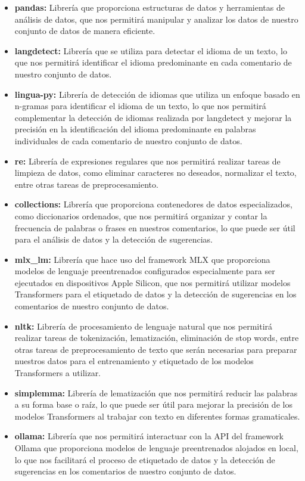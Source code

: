 \begin{itemize}
    \item \textbf{pandas:} Librería que proporciona estructuras de datos y herramientas de análisis de datos, que nos permitirá manipular y analizar los datos de nuestro conjunto de datos de manera eficiente.
    \item \textbf{langdetect:} Librería que se utiliza para detectar el idioma de un texto, lo que nos permitirá identificar el idioma predominante en cada comentario de nuestro conjunto de datos.
    \item \textbf{lingua-py:} Librería de detección de idiomas que utiliza un enfoque basado en n-gramas para identificar el idioma de un texto, lo que nos permitirá complementar la detección de idiomas realizada por langdetect y mejorar la precisión en la identificación del idioma predominante en palabras individuales de cada comentario de nuestro conjunto de datos.
    \item \textbf{re:} Librería de expresiones regulares que nos permitirá realizar tareas de limpieza de datos, como eliminar caracteres no deseados, normalizar el texto, entre otras tareas de preprocesamiento.
    \item \textbf{collections:} Librería que proporciona contenedores de datos especializados, como diccionarios ordenados, que nos permitirá organizar y contar la frecuencia de palabras o frases en nuestros comentarios, lo que puede ser útil para el análisis de datos y la detección de sugerencias.
    \item \textbf{mlx\_lm:} Librería que hace uso del framework MLX que proporciona modelos de lenguaje preentrenados configurados especialmente para ser ejecutados en dispositivos Apple Silicon, que nos permitirá utilizar modelos Transformers para el etiquetado de datos y la detección de sugerencias en los comentarios de nuestro conjunto de datos.
    \item \textbf{nltk:} Librería de procesamiento de lenguaje natural que nos permitirá realizar tareas de tokenización, lematización, eliminación de stop words, entre otras tareas de preprocesamiento de texto que serán necesarias para preparar nuestros datos para el entrenamiento y etiquetado de los modelos Transformers a utilizar.
    \item \textbf{simplemma:} Librería de lematización que nos permitirá reducir las palabras a su forma base o raíz, lo que puede ser útil para mejorar la precisión de los modelos Transformers al trabajar con texto en diferentes formas gramaticales.
    \item \textbf{ollama:} Librería que nos permitirá interactuar con la API del framework Ollama que proporciona modelos de lenguaje preentrenados alojados en local, lo que nos facilitará el proceso de etiquetado de datos y la detección de sugerencias en los comentarios de nuestro conjunto de datos.
\end{itemize}

